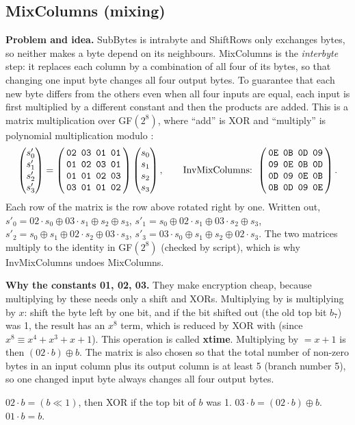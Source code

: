 \subsection{MixColumns (mixing) \hot}

\textbf{Problem and idea.} SubBytes is intrabyte and ShiftRows only exchanges bytes, so neither makes a byte depend on its neighbours. MixColumns is the \emph{interbyte} step: it replaces each column by a combination of all four of its bytes, so that changing one input byte changes all four output bytes. To guarantee that each new byte differs from the others even when all four inputs are equal, each input is first multiplied by a different constant and then the products are added. This is a matrix multiplication over GF$(2^8)$, where ``add'' is XOR and ``multiply'' is polynomial multiplication modulo :
\[
\begin{pmatrix}s'_{0}\\s'_{1}\\s'_{2}\\s'_{3}\end{pmatrix}
= \aesM{02&03&01&01\\01&02&03&01\\01&01&02&03\\03&01&01&02}
\begin{pmatrix}s_{0}\\s_{1}\\s_{2}\\s_{3}\end{pmatrix},
\qquad
\text{InvMixColumns: } \aesM{0E&0B&0D&09\\09&0E&0B&0D\\0D&09&0E&0B\\0B&0D&09&0E}.
\]
Each row of the matrix is the row above rotated right by one. Written out, $s'_0 = 02 \cdot s_0 \oplus 03 \cdot s_1 \oplus s_2 \oplus s_3$, $s'_1 = s_0 \oplus 02 \cdot s_1 \oplus 03 \cdot s_2 \oplus s_3$, $s'_2 = s_0 \oplus s_1 \oplus 02 \cdot s_2 \oplus 03 \cdot s_3$, $s'_3 = 03 \cdot s_0 \oplus s_1 \oplus s_2 \oplus 02 \cdot s_3$. The two matrices multiply to the identity in GF$(2^8)$ (checked by script), which is why InvMixColumns undoes MixColumns.

\textbf{Why the constants 01, 02, 03.} They make encryption cheap, because multiplying by these needs only a shift and XORs. Multiplying by  is multiplying by $x$: shift the byte left by one bit, and if the bit shifted out (the old top bit $b_7$) was 1, the result has an $x^8$ term, which is reduced by XOR with  (since $x^8 \equiv x^4 + x^3 + x + 1$). This operation is called \textbf{xtime}. Multiplying by  $= x + 1$ is then $(02 \cdot b) \oplus b$. The matrix is also chosen so that the total number of non-zero bytes in an input column plus its output column is at least 5 (branch number 5), so one changed input byte always changes all four output bytes.
\begin{mustknow}[: xtime]
$02 \cdot b = (b \ll 1)$, then XOR  if the top bit of $b$ was 1. \qquad $03 \cdot b = (02 \cdot b) \oplus b$. \qquad $01 \cdot b = b$.
\end{mustknow}

